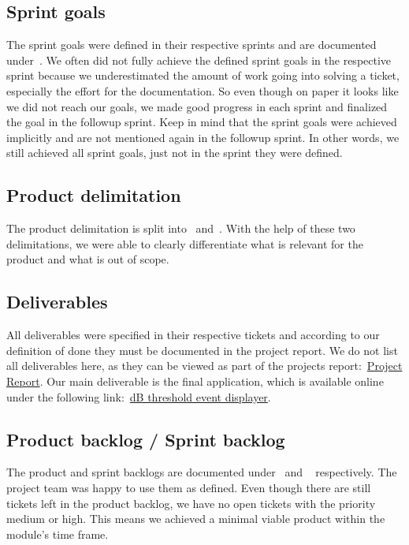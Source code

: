 \subsection{Sprint goals}\label{subsec:sprint-goals-review}
The sprint goals were defined in their respective sprints and are documented under~.
We often did not fully achieve the defined sprint goals in the respective sprint
because we underestimated the amount of work going into solving a ticket, especially the effort for the documentation.
So even though on paper it looks like we did not reach our goals, we made good progress in each sprint and finalized the
goal in the followup sprint.
Keep in mind that the sprint goals were achieved implicitly and are not mentioned again
in the followup sprint.
In other words, we still achieved all sprint goals, just not in the sprint they were defined.

\subsection{Product delimitation}\label{subsec:product-delimination-review}
The product delimitation is split into~ and~.
With the help of these two delimitations, we were able to clearly differentiate what is relevant for the product and what is out of scope.

\subsection{Deliverables}\label{subsec:deliverables-review}
All deliverables were specified in their respective tickets and according to our definition of done they must be documented in the project report.
We do not list all deliverables here, as they can be viewed as part of the projects report:~\href{https://gitlab.ti.bfh.ch/decibel-threshold-event-displayer/decibel-threshold-event-displayer/-/raw/main/doc/report/report.pdf}{Project Report}.
Our main deliverable is the final application, which is available online under the following link:~\href{https://decibel-threshold-event-displayer.github.io/#/}{dB threshold event displayer}.

\subsection{Product backlog / Sprint backlog}\label{subsec:backlogs-review}
The product and sprint backlogs are documented under~ and ~ respectively.
The project team was happy to use them as defined.
Even though there are still tickets left in the product backlog,
we have no open tickets with the priority medium or high.
This means we achieved a minimal viable product within the module's time frame.
